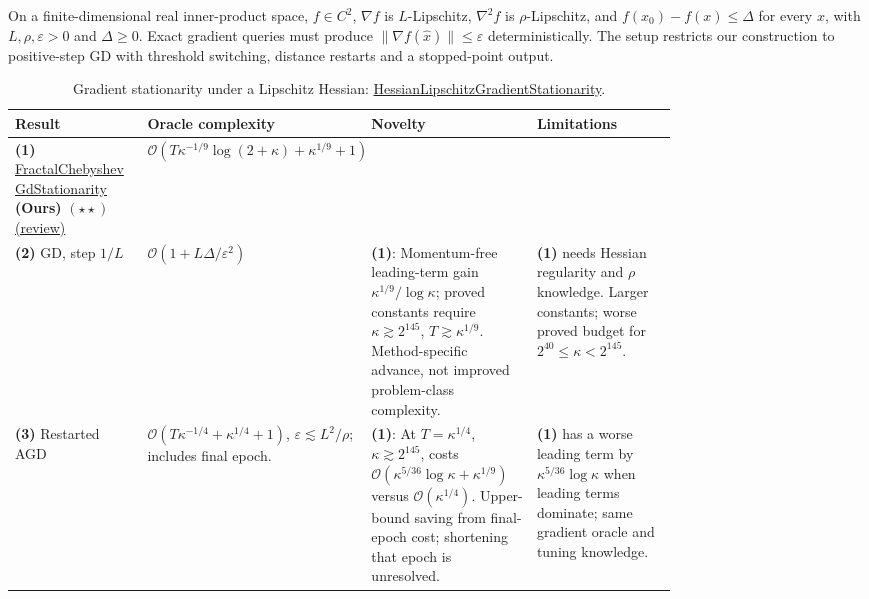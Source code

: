 \begin{table}[tp]
\centering
\caption{Gradient stationarity under a Lipschitz Hessian: \href{https://github.com/k3nfalt/longtails/blob/main/LongTails/Setups/HessianLipschitzGradientStationarity.lean}{HessianLipschitzGradientStationarity}.}\label{tab:HessianLipschitzGradientStationarity}
\parbox{\linewidth}{\footnotesize On a finite-dimensional real inner-product space, $f\in C^2$, $\nabla f$ is $L$-Lipschitz, $\nabla^2 f$ is $\rho$-Lipschitz, and $f(x_0)-f(x)\le\Delta$ for every $x$, with $L,\rho,\varepsilon>0$ and $\Delta\ge0$. Exact gradient queries must produce $\|\nabla f(\widehat x)\|\le\varepsilon$ deterministically. The setup restricts our construction to positive-step GD with threshold switching, distance restarts and a stopped-point output.}\par\smallskip
\begin{threeparttable}
\footnotesize
\setlength{\tabcolsep}{4pt}\renewcommand{\arraystretch}{1.25}
\begin{tabularx}{\linewidth}{@{}>{\raggedright\arraybackslash}p{0.20\linewidth}>{\raggedright\arraybackslash}p{0.32\linewidth}>{\raggedright\arraybackslash}p{0.25\linewidth}>{\raggedright\arraybackslash}X@{}}
\toprule
\textbf{Result} & \textbf{Oracle complexity} & \textbf{Novelty} & \textbf{Limitations} \\
\midrule
\textbf{(1)} \href{https://github.com/k3nfalt/longtails/blob/main/LongTails/Theorems/FractalChebyshevGdStationarity.lean}{Fractal\allowbreak Chebyshev\allowbreak Gd\allowbreak Stationarity} \textbf{(Ours)} $(\star\star)$ \href{https://github.com/k3nfalt/longtails/blob/main/scripts/reviews/FractalChebyshevGdStationarity.md}{(review)} & $\mathcal{O}\!\left(T\kappa^{-1/9}\log(2+\kappa)+\kappa^{1/9}+1\right)$ & & \\
\midrule[1.2pt]
\textbf{(2)} GD, step $1/L$ \citep[\S1.2.3]{hlgsNesterov2018} & $\mathcal{O}(1+L\Delta/\varepsilon^2)$ & \textbf{(1)}: Momentum-free leading-term gain $\kappa^{1/9}/\log\kappa$; proved constants require $\kappa\gtrsim2^{145}$, $T\gtrsim\kappa^{1/9}$. Method-specific advance, not improved problem-class complexity. & \textbf{(1)} needs Hessian regularity and $\rho$ knowledge. Larger constants; worse proved budget for $2^{40}\le\kappa<2^{145}$. \\
\midrule
\textbf{(3)} Restarted AGD \citep[Theorem 1, \S4.1]{gtoLiLin2023} & $\mathcal{O}\!\left(T\kappa^{-1/4}+\kappa^{1/4}+1\right)$, $\varepsilon\lesssim L^2/\rho$; includes final epoch. & \textbf{(1)}: At $T=\kappa^{1/4}$, $\kappa\gtrsim2^{145}$, costs $\mathcal{O}(\kappa^{5/36}\log\kappa+\kappa^{1/9})$ versus $\mathcal{O}(\kappa^{1/4})$. Upper-bound saving from final-epoch cost; shortening that epoch is unresolved. & \textbf{(1)} has a worse leading term by $\kappa^{5/36}\log\kappa$ when leading terms dominate; same gradient oracle and tuning knowledge. \\

\end{tabularx}
\end{threeparttable}
\end{table}
